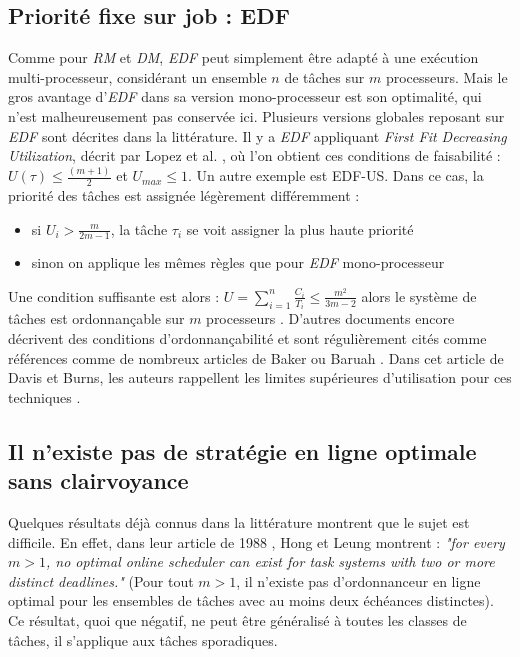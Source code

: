 \documentclass[11pt,a4paper,oneside]{report}
\begin{document}
	\subsection{Priorité fixe sur job : EDF}
	Comme pour \textit{RM} et \textit{DM}, \textit{EDF} peut simplement être adapté à une exécution multi-processeur, 
	considérant un ensemble $n$ de tâches sur $m$ processeurs. Mais le gros avantage d'\textit{EDF} 
	dans sa version mono-processeur est son optimalité, qui n'est malheureusement pas conservée ici. 
	Plusieurs versions globales reposant sur \textit{EDF} sont décrites dans la littérature. 
	Il y a \textit{EDF} appliquant \textit{First Fit Decreasing Utilization}, décrit par 
	Lopez et al. \cite{lopez_utilization_2004}, où l'on obtient ces conditions de faisabilité : \medskip
	$U(\tau) \leq \frac{(m + 1)}{2}$ et $U_{max} \leq 1$. \medskip
	Un autre exemple est EDF-US. 
	Dans ce cas, la priorité des tâches est assignée légèrement différemment :\medskip
	\begin{itemize}
		\item si $U_i > \frac{m}{2m-1}$, la tâche $\tau_i$ se voit assigner la plus haute priorité
		\item sinon on applique les mêmes règles que pour \textit{EDF} mono-processeur
	\end{itemize}
	Une condition suffisante est alors :\medskip
	$U = \sum_{i=1}^{n}\frac{C_i}{T_i} \leq \frac{m^2}{3m-2}$
	alors le système de tâches est ordonnançable sur $m$ processeurs
	\cite{andersson_static-priority_2001}. \medskip
	D'autres documents encore décrivent des conditions d'ordonnançabilité et sont régulièrement 
	cités comme références comme de nombreux articles de Baker 
	\cite{baker_multiprocessor_2003} \cite{baker_analysis_2005} ou Baruah \cite{baruah_optimal_2004}
	\cite{baruah_schedulability_2008}. 
	Dans cet article de Davis et Burns, les auteurs rappellent les 
	limites supérieures d'utilisation pour ces techniques \cite{davis_survey_2011}.\medskip
	
	
	\subsection{Il n'existe pas de stratégie en ligne optimale sans clairvoyance}
	Quelques résultats déjà connus dans la littérature montrent que le sujet est difficile. 
	En effet, dans leur article de 1988 \cite{hong_-line_1988}, Hong et Leung montrent :\medskip
	\textit{"for every $m > 1$, no optimal online scheduler can exist for task systems with two or more distinct
		deadlines."} (Pour tout $m > 1$, il n'existe pas d'ordonnanceur en ligne 
	optimal pour les ensembles de tâches avec au moins deux échéances distinctes). 
	Ce résultat, quoi que négatif, ne peut être généralisé à toutes les classes de tâches, il s'applique 
	aux tâches sporadiques. 
	
\end{document}
